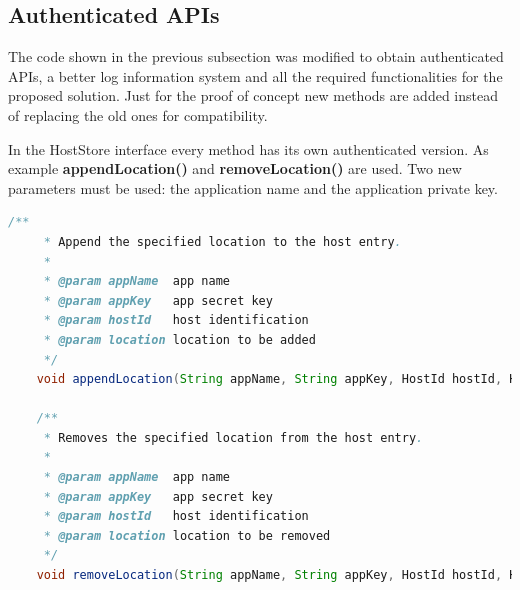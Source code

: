 \subsection{Authenticated APIs}
The code shown in the previous subsection was modified to obtain authenticated APIs, a better log information system and all the required functionalities for the proposed solution. Just for the proof of concept new methods are added instead of replacing the old ones for compatibility.
\medskip

In the HostStore interface every method has its own authenticated version. As example \textbf{appendLocation()} and \textbf{removeLocation()} are used. Two new parameters must be used: the application name and the application private key.
\begin{lstlisting}[language=java,firstnumber=102]
    /**
     * Append the specified location to the host entry.
     *
     * @param appName  app name 
     * @param appKey   app secret key 
     * @param hostId   host identification
     * @param location location to be added
     */
    void appendLocation(String appName, String appKey, HostId hostId, HostLocation location);

    /**
     * Removes the specified location from the host entry.
     *
     * @param appName  app name 
     * @param appKey   app secret key 
     * @param hostId   host identification
     * @param location location to be removed
     */
    void removeLocation(String appName, String appKey, HostId hostId, HostLocation location);
\end{lstlisting}


